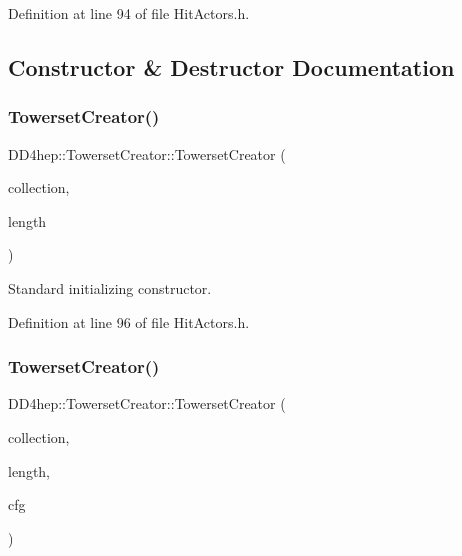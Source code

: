 Definition at line 94 of file Hit\+Actors.\+h.



\subsection{Constructor \& Destructor Documentation}
\hypertarget{struct_d_d4hep_1_1_towerset_creator_ad29dbe8a2d87c04776af0852f614ee13}{}\label{struct_d_d4hep_1_1_towerset_creator_ad29dbe8a2d87c04776af0852f614ee13} 
\subsubsection{\texorpdfstring{Towerset\+Creator()}{TowersetCreator()}\hspace{0.1cm}{\footnotesize\ttfamily [1/2]}}
{\footnotesize\ttfamily D\+D4hep\+::\+Towerset\+Creator\+::\+Towerset\+Creator (\begin{DoxyParamCaption}\item[{const std\+::string \&}]{collection,  }\item[{size\+\_\+t}]{length }\end{DoxyParamCaption})\hspace{0.3cm}{\ttfamily [inline]}}



Standard initializing constructor. 



Definition at line 96 of file Hit\+Actors.\+h.

\hypertarget{struct_d_d4hep_1_1_towerset_creator_a7e565ec3d9642bf0a3f778e730d1b9aa}{}\label{struct_d_d4hep_1_1_towerset_creator_a7e565ec3d9642bf0a3f778e730d1b9aa} 
\subsubsection{\texorpdfstring{Towerset\+Creator()}{TowersetCreator()}\hspace{0.1cm}{\footnotesize\ttfamily [2/2]}}
{\footnotesize\ttfamily D\+D4hep\+::\+Towerset\+Creator\+::\+Towerset\+Creator (\begin{DoxyParamCaption}\item[{const std\+::string \&}]{collection,  }\item[{size\+\_\+t}]{length,  }\item[{const \hyperlink{class_d_d4hep_1_1_display_configuration_1_1_config}{Display\+Configuration\+::\+Config} \&}]{cfg }\end{DoxyParamCaption})\hspace{0.3cm}{\ttfamily [inline]}}



